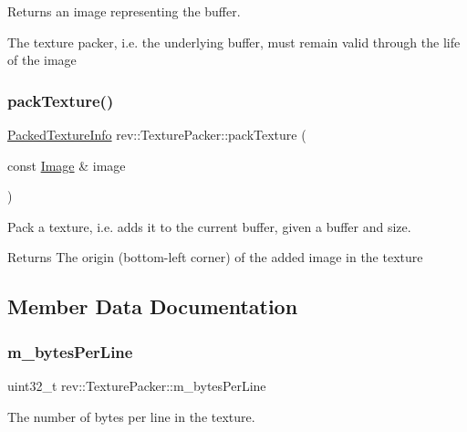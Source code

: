 Returns an image representing the buffer. 

The texture packer, i.\+e. the underlying buffer, must remain valid through the life of the image \mbox{\label{classrev_1_1_texture_packer_a713b0e95dafb6e9086cd02a7594b9e59}} 
\subsubsection{\texorpdfstring{packTexture()}{packTexture()}}
{\footnotesize\ttfamily \mbox{\hyperlink{structrev_1_1_packed_texture_info}{Packed\+Texture\+Info}} rev\+::\+Texture\+Packer\+::pack\+Texture (\begin{DoxyParamCaption}\item[{const \mbox{\hyperlink{classrev_1_1_image}{Image}} \&}]{image }\end{DoxyParamCaption})}



Pack a texture, i.\+e. adds it to the current buffer, given a buffer and size. 

\begin{DoxyReturn}{Returns}
The origin (bottom-\/left corner) of the added image in the texture 
\end{DoxyReturn}


\subsection{Member Data Documentation}
\mbox{\label{classrev_1_1_texture_packer_aafb7e301e8244e3bc43b3a3d706fb30b}} 
\subsubsection{\texorpdfstring{m\_bytesPerLine}{m\_bytesPerLine}}
{\footnotesize\ttfamily uint32\+\_\+t rev\+::\+Texture\+Packer\+::m\+\_\+bytes\+Per\+Line\hspace{0.3cm}{\ttfamily [protected]}}



The number of bytes per line in the texture. 

